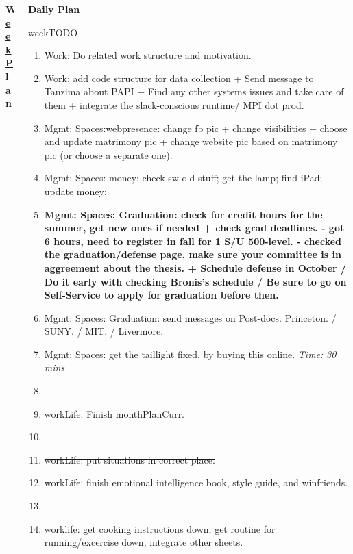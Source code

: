 \documentclass[serif,mathserif,final]{beamer}
\newcommand{\doneTask}[1]{\item \sout{#1}}
\newcommand{\timeEst}[1]{\textit{Time:} \textit{#1}}
\begin{document}
\begin{frame}{}
\begin{columns}[t]
\begin{column}{0.27\linewidth} {\textbf{\underline{Week Plan}}}
\end{column} %
\begin{column}{0.33\linewidth}{\textbf{\underline{Daily Plan}}} 


\begin{block}{\small weekTODO} 

\begin{enumerate}

\item \tiny  Work: Do related work structure and motivation. 

\item \tiny Work: add code structure for data collection + Send message to Tanzima about PAPI + Find any other systems issues and take care of them + integrate the slack-conscious runtime/ MPI dot prod.  

\item \tiny Mgmt: Spaces:webpresence: change fb pic + change visibilities + choose and update matrimony pic + change website pic based on matrimony pic (or choose a separate one). 

\item \tiny Mgmt: Spaces: money: check sw old stuff; get the lamp; find iPad; update money;
\item \tiny \textbf{Mgmt: Spaces: Graduation: check for credit hours for the summer, get new ones if needed + check grad deadlines.  - got 6 hours,  need to register in fall for 1 S/U 500-level.  - checked the graduation/defense page, make sure your committee is in aggreement about the thesis. + Schedule defense in October / Do it early with checking Bronis's schedule / Be sure to go on Self-Service to apply for graduation before then. }
\item \tiny Mgmt: Spaces: Graduation: send messages on Post-docs. Princeton. / SUNY. / MIT. / Livermore. 

\item \tiny Mgmt: Spaces: get the taillight fixed, by buying this online. \timeEst{30 mins} 

\item \tiny \doneTask{workLife: Finish monthPlanCurr.} 
\item \tiny \doneTask{workLife: put situations in correct place.} 

\item \tiny workLife: finish emotional intelligence book, style guide, and winfriends. 
\item \tiny \doneTask{worklife: get cooking instructions down, get routine for running/excercise down, integrate other sheets.} 


\end{enumerate}
\end{block}
\end{column}
\end{columns}
\end{frame}
\end{document}
